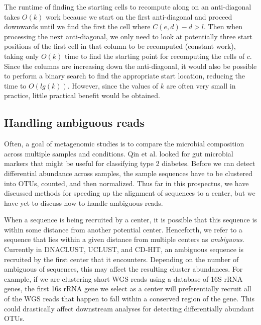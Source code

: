 The runtime of finding the starting cells to recompute along on an anti-diagonal takes $O(k)$ work because we start on the first anti-diagonal and proceed downwards until we find the first the cell where $C(e,d) - d > l$.
Then when processing the next anti-diagonal, we only need to look at potentially three start positions of the first cell in that column to be recomputed (constant work), taking only $O(k)$ time to find the starting point for recomputing the cells of $c$.  Since the columns are increasing down the anti-diagonal, it would also be possible to perform a binary search to find the appropriate start location, reducing the time to $O(lg(k))$.
However, since the values of $k$ are often very small in practice, little practical benefit would be obtained.




\subsection{Handling ambiguous reads}

Often, a goal of metagenomic studies is to compare the microbial composition across multiple samples and conditions.
Qin et al. looked for gut microbial markers that might be useful for classifying type 2 diabetes\cite{qin_metagenome-wide_2012}.
Before we can detect differential abundance across samples, the sample sequences have to be clustered into OTUs, counted, and then normalized\cite{paulson_differential_2013}.
Thus far in this prospectus, we have discussed methods for speeding up the alignment of sequences to a center, but we have yet to discuss how to handle ambiguous reads.

When a sequence is being recruited by a center, it is possible that this sequence is within some distance from another potential center.
Henceforth, we refer to a sequence that lies within a given distance from multiple centers as \emph{ambiguous}.
Currently in DNACLUST, UCLUST, and CD-HIT, an ambiguous sequence is recruited by the first center that it encounters.
Depending on the number of ambiguous of sequences, this may affect the resulting cluster abundances.
For example, if we are clustering short WGS reads using a database of 16S rRNA genes, the first 16s rRNA gene we select as a center will preferentially recruit all of the WGS reads that happen to fall within a conserved region of the gene.
This could drastically affect downstream analyses for detecting differentially abundant OTUs.

